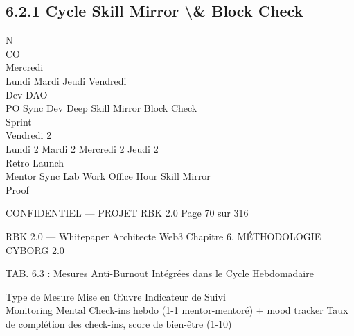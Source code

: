 \documentclass[12pt,landscape,a4paper]{article}
\newenvironment{confidential}
{\begin{tcolorbox}[
    colback=rbkred!5!white,
    colframe=rbkred!75!black,
    title=CONFIDENTIEL,
    fonttitle=\bfseries\color{white},
    coltitle=rbkred!75!black,
    breakable,
    enhanced,
    frame hidden,
    borderline west={2pt}{0pt}{rbkred!75!black}
]}
{\end{tcolorbox}}
\begin{document}
\subsection{6.2.1 Cycle Skill Mirror \textbackslash{}& Block Check}
\vspace{0.5em}
\vspace{0.5em}
N\\
CO\\
Mercredi\\
Lundi        Mardi                           Jeudi         Vendredi\\
Dev DAO\\
PO Sync     Dev Deep                       Skill Mirror   Block Check\\
Sprint\\
\vspace{0.5em}
\vspace{0.5em}
\vspace{0.5em}
Vendredi 2\\
Lundi 2      Mardi 2       Mercredi 2        Jeudi 2\\
Retro Launch\\
Mentor Sync     Lab Work       Office Hour     Skill Mirror\\
Proof\\
\vspace{0.5em}
\vspace{0.5em}
\vspace{0.5em}
\vspace{0.5em}
\begin{confidential}CONFIDENTIEL — PROJET RBK 2.0                                   Page 70 sur 316\end{confidential}
RBK 2.0 — Whitepaper Architecte Web3                                                                                Chapitre 6. MÉTHODOLOGIE CYBORG 2.0\\
\vspace{0.5em}
\vspace{0.5em}
\begin{center}\begin{tabular}TAB. 6.3 : Mesures Anti-Burnout Intégrées dans le Cycle Hebdomadaire\end{tabular}\end{center}
\vspace{0.5em}
\vspace{0.5em}
Type de Mesure         Mise en Œuvre                                                             Indicateur de Suivi\\
Monitoring Mental      Check-ins hebdo (1-1 mentor-mentoré) + mood tracker                       Taux de complétion des check-ins, score de bien-être (1-10)\\
\end{document}

